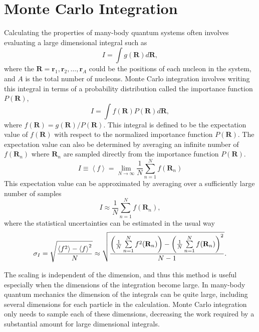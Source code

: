 \section{Monte Carlo Integration}
Calculating the properties of many-body quantum systems often involves evaluating a large dimensional integral such as
\begin{equation}
   I=\int g(\mathbf{R}) d\mathbf{R},
\end{equation}
where the $\mathbf{R}=\mathbf{r}_1,\mathbf{r}_2,\ldots,\mathbf{r}_A$ could be the positions of each nucleon in the system, and $A$ is the total number of nucleons. Monte Carlo integration involves writing this integral in terms of a probability distribution called the importance function $P(\mathbf{R})$,
\begin{equation}
   I=\int f(\mathbf{R}) P(\mathbf{R}) d\mathbf{R},
\end{equation}
where $f(\mathbf{R}) = g(\mathbf{R})/P(\mathbf{R})$. This integral is defined to be the expectation value of $f(\mathbf{R})$ with respect to the normalized importance function $P(\mathbf{R})$. The expectation value can also be determined by averaging an infinite number of $f(\mathbf{R}_n)$ where $\mathbf{R}_n$ are sampled directly from the importance function $P(\mathbf{R})$.
\begin{equation}
   I \equiv \left<f\right> = \lim\limits_{N\rightarrow\infty} \frac{1}{N} \sum\limits_{n=1}^N f(\mathbf{R}_n)
   \label{equ:mci}
\end{equation}
This expectation value can be approximated by averaging over a sufficiently large number of samples
\begin{equation}
   I \approx \frac{1}{N} \sum\limits_{n=1}^N f(\mathbf{R}_n),
\end{equation}
where the statistical uncertainties can be estimated in the usual way
\begin{equation}
   \sigma_{I} = \sqrt{\frac{\left< f^2 \right>-\left< f \right>^2}{N}} \approx \sqrt{\frac{\left(\frac{1}{N}\sum\limits_{n=1}^Nf^2(\mathbf{R}_n)\right) - \left(\frac{1}{N}\sum\limits_{n=1}^Nf(\mathbf{R}_n)\right)^2}{N-1}}.
\end{equation}

The scaling is independent of the dimension, and thus this method is useful especially when the dimensions of the integration become large. In many-body quantum mechanics the dimension of the integrals can be quite large, including several dimensions for each particle in the calculation. Monte Carlo integration only needs to sample each of these dimensions, decreasing the work required by a substantial amount for large dimensional integrals.

